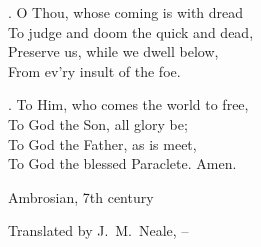 {{. O Thou, whose coming is with dread\\
To judge and doom the quick and dead,\\
Preserve us, while we dwell below,\\
From ev’ry insult of the foe.

. To Him, who comes the world to free,\\
To God the Son, all glory be;\\
To God the Father, as is meet,\\
To God the blessed Paraclete. Amen.

}

}


\endlyrics

\medskip

\source Ambrosian, 7th century

\source Translated by J.~M.~Neale, {}--

